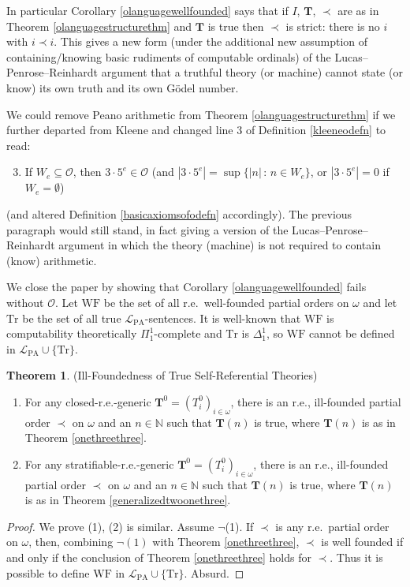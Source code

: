 \documentclass[reqno]{article}
\theoremstyle{definition}
\newtheorem{theorem}{Theorem}
\def\N{\mathbb{N}}
\def\L{\mathscr{L}}
\def\T{\mathbf{T}}
\def\O{\mathcal{O}}
\def\LPA{\L_{\mathrm{PA}}}
\def\Tr{\mathrm{Tr}}
\begin{document}
In particular
Corollary \ref{olanguagewellfounded} says that
if $I$, $\T$, $\prec$ are as in Theorem \ref{olanguagestructurethm} and $\T$ is true
then $\prec$ is strict: there is no $i$ with $i\prec i$.
This gives a new form
(under the additional new assumption of containing/knowing basic rudiments of computable ordinals)
of the Lucas--Penrose--Reinhardt argument that a truthful theory (or machine)
cannot state (or know) its own truth and its own G\"odel number.

We could remove Peano arithmetic from Theorem \ref{olanguagestructurethm}
if we further departed from Kleene and changed line 3 of Definition 
\ref{kleeneodefn} to read:
\begin{enumerate}
\setcounter{enumi}{2}
\item If $W_e\subseteq\O$, then $3\cdot 5^e\in\O$ (and 
$|3\cdot 5^e|=\sup\{|n|\,:\,n\in W_e\}$, or $|3\cdot 5^e|=0$
if $W_e=\emptyset$)
\end{enumerate}
(and altered Definition \ref{basicaxiomsofodefn} accordingly).
The previous paragraph would still stand, in fact giving a version
of the Lucas--Penrose--Reinhardt argument in which the theory (machine)
is not required to contain (know) arithmetic.


We close the paper by showing that Corollary \ref{olanguagewellfounded}
fails without $\O$.  Let $\mathrm{WF}$ be the set
of all r.e.~well-founded partial orders on $\omega$
and let $\Tr$ be the set of all
true $\LPA$-sentences.
It is well-known that $\mathrm{WF}$ is computability theoretically
$\Pi^1_1$-complete and $\Tr$ is $\Delta^1_1$, so
$\mathrm{WF}$ cannot be defined
in $\LPA\cup\{\Tr\}$.

\begin{theorem}
(Ill-Foundedness of True Self-Referential Theories)
\begin{enumerate}
\item
For any closed-r.e.-generic $\T^0=(T^0_i)_{i\in\omega}$,
there is an r.e., ill-founded partial order $\prec$ on $\omega$
and an $n\in\N$
such that $\T(n)$ is true,
where $\T(n)$ is as in Theorem \ref{onethreethree}.
\item
For any stratifiable-r.e.-generic $\T^0=(T^0_i)_{i\in\omega}$, there is an 
r.e., ill-founded partial order $\prec$ on $\omega$ and an $n\in\N$ such that
$\T(n)$ is true, where $\T(n)$ is as in Theorem \ref{generalizedtwoonethree}.
\end{enumerate}
\end{theorem}

\begin{proof}
We prove (1), (2) is similar.
Assume $\neg$(1).  If $\prec$ is any r.e.~partial order on $\omega$,
then, combining $\neg(1)$ with Theorem \ref{onethreethree},
$\prec$ is well founded if and only if the conclusion of Theorem \ref{onethreethree} holds for $\prec$.
Thus it is possible to define $\mathrm{WF}$ in $\LPA\cup\{\Tr\}$.
Absurd.
\end{proof}
\end{document}

